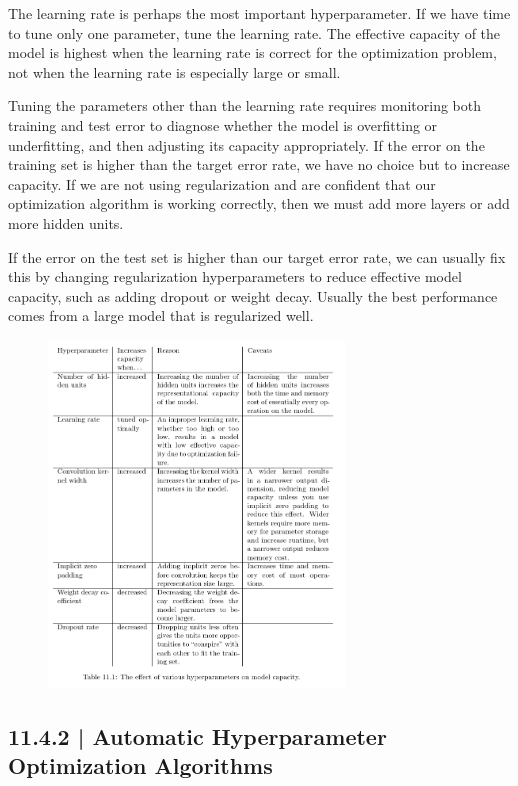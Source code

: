 \documentclass[letterpaper, 12pt]{report}
\begin{document}
The learning rate is perhaps the most important hyperparameter. If we have time to tune only one parameter, tune the learning rate. The effective capacity of the model is highest when the learning rate is correct for the optimization problem, not when the learning rate is especially large or small. 

Tuning the parameters other than the learning rate requires monitoring both training and test error to diagnose whether the model is overfitting or underfitting, and then adjusting its capacity appropriately. If the error on the training set is higher than the target error rate, we have no choice but to increase capacity. If we are not using regularization and are confident that our optimization algorithm is working correctly, then we must add more layers or add more hidden units. 

If the error on the test set is higher than our target error rate, we can usually fix this by changing regularization hyperparameters to reduce effective model capacity, such as adding dropout or weight decay. Usually the best performance comes from a large model that is regularized well. 

\begin{figure}[h]
  \centering
  \includegraphics[width=0.7\textwidth]{hyperparam_model_capacity.png}
\end{figure}

\subsection{11.4.2 | Automatic  Hyperparameter Optimization Algorithms}
\end{document}
